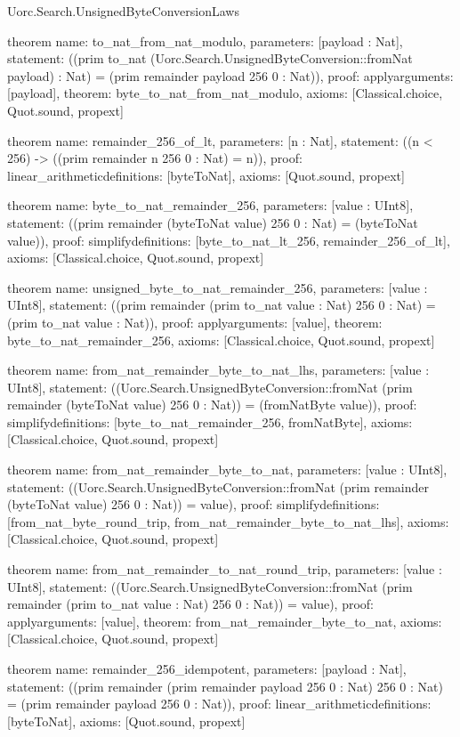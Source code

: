 \begin{lexlean}{Uorc.Search.UnsignedByteConversionLaws}
\begin{semanticmodule}
theorem{
  name: to_nat_from_nat_modulo,
  parameters: [payload : Nat],
  statement: ((prim to_nat (Uorc.Search.UnsignedByteConversion::fromNat payload) : Nat) = (prim remainder payload 256 0 : Nat)),
  proof: apply{arguments: [payload], theorem: byte_to_nat_from_nat_modulo},
  axioms: [Classical.choice, Quot.sound, propext]
}

theorem{
  name: remainder_256_of_lt,
  parameters: [n : Nat],
  statement: ((n < 256) -> ((prim remainder n 256 0 : Nat) = n)),
  proof: linear_arithmetic{definitions: [byteToNat]},
  axioms: [Quot.sound, propext]
}

theorem{
  name: byte_to_nat_remainder_256,
  parameters: [value : UInt8],
  statement: ((prim remainder (byteToNat value) 256 0 : Nat) = (byteToNat value)),
  proof: simplify{definitions: [byte_to_nat_lt_256, remainder_256_of_lt]},
  axioms: [Classical.choice, Quot.sound, propext]
}

theorem{
  name: unsigned_byte_to_nat_remainder_256,
  parameters: [value : UInt8],
  statement: ((prim remainder (prim to_nat value : Nat) 256 0 : Nat) = (prim to_nat value : Nat)),
  proof: apply{arguments: [value], theorem: byte_to_nat_remainder_256},
  axioms: [Classical.choice, Quot.sound, propext]
}

theorem{
  name: from_nat_remainder_byte_to_nat_lhs,
  parameters: [value : UInt8],
  statement: ((Uorc.Search.UnsignedByteConversion::fromNat (prim remainder (byteToNat value) 256 0 : Nat)) = (fromNatByte value)),
  proof: simplify{definitions: [byte_to_nat_remainder_256, fromNatByte]},
  axioms: [Classical.choice, Quot.sound, propext]
}

theorem{
  name: from_nat_remainder_byte_to_nat,
  parameters: [value : UInt8],
  statement: ((Uorc.Search.UnsignedByteConversion::fromNat (prim remainder (byteToNat value) 256 0 : Nat)) = value),
  proof: simplify{definitions: [from_nat_byte_round_trip, from_nat_remainder_byte_to_nat_lhs]},
  axioms: [Classical.choice, Quot.sound, propext]
}

theorem{
  name: from_nat_remainder_to_nat_round_trip,
  parameters: [value : UInt8],
  statement: ((Uorc.Search.UnsignedByteConversion::fromNat (prim remainder (prim to_nat value : Nat) 256 0 : Nat)) = value),
  proof: apply{arguments: [value], theorem: from_nat_remainder_byte_to_nat},
  axioms: [Classical.choice, Quot.sound, propext]
}

theorem{
  name: remainder_256_idempotent,
  parameters: [payload : Nat],
  statement: ((prim remainder (prim remainder payload 256 0 : Nat) 256 0 : Nat) = (prim remainder payload 256 0 : Nat)),
  proof: linear_arithmetic{definitions: [byteToNat]},
  axioms: [Quot.sound, propext]
}


\end{semanticmodule}
\end{lexlean}
